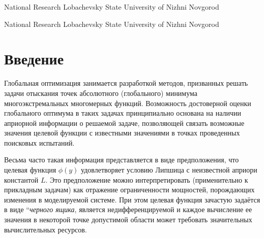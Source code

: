 \documentclass[10pt,a4paper]{book}
\begin{document}


{National Research Lobachevsky State University of Nizhni Novgorod}

{National Research Lobachevsky State University of Nizhni Novgorod}

\MakeArticleHeader

\pagebreak

\section{Введение}
Глобальная оптимизация занимается разработкой методов, призванных решать задачи отыскания точек абсолютного (глобального) минимума многоэкстремальных многомерных функций. Возможность достоверной оценки глобального оптимума в таких задачах принципиально основана на наличии априорной информации о решаемой задаче, позволяющей связать возможные значения целевой функции с известными значениями в точках проведенных поисковых испытаний.

Весьма часто такая информация представляется в виде предположения, что целевая функция $\phi(y)$ удовлетворяет условию Липшица с неизвестной априори константой $L$. Это предположение можно интерпретировать (применительно к прикладным задачам) как отражение ограниченности мощностей, порождающих изменения в моделируемой системе. При этом целевая функция зачастую задаётся в виде ``\textit{черного ящика}, является недифференцируемой и каждое вычисление ее значения в некоторой точке допустимой области может требовать значительных вычислительных ресурсов.
\end{document}
